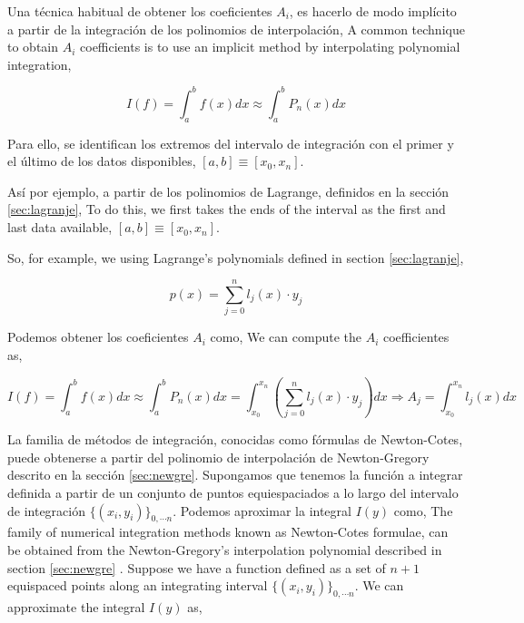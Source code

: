 \begin{paracol}{2}
Una técnica habitual de obtener los coeficientes $A_i$, es hacerlo de modo implícito a partir de la integración  de los polinomios de interpolación,
\switchcolumn
A common  technique to obtain $A_i$ coefficients is to use an implicit method by interpolating polynomial integration,
\end{paracol}
 \begin{equation*}
I(f)=\int_a^bf(x)dx \approx \int_a^bP_n(x)dx
\end{equation*}
\begin{paracol}{2}
Para ello, se identifican los extremos del intervalo de integración con el primer y el último de los datos disponibles, $[a,b]\equiv [x_0,x_n]$.

Así por ejemplo, a partir de los polinomios de Lagrange, definidos en la sección \ref{sec:lagranje},
\switchcolumn
To do this, we first takes the ends of the interval as the first and last data available, $[a,b]\equiv [x_0,x_n]$.

So, for example, we using Lagrange's polynomials defined in section \ref{sec:lagranje},
\end{paracol}
\begin{equation*}
p(x)=\sum_{j=0}^n l_j(x)\cdot y_j
\end{equation*}
\begin{paracol}{2}
Podemos obtener los coeficientes $A_i$ como,
\switchcolumn	
We can compute the $A_i$ coefficientes as,
\end{paracol}
\begin{equation*}
I(f)=\int_a^bf(x)dx \approx \int_a^bP_n(x)dx=\int_{x_0}^{x_n}\left( \sum_{j=0}^n l_j(x)\cdot y_j \right) dx \Rightarrow A_j=\int_{x_0}^{x_n}l_j(x)dx
\end{equation*}
\begin{paracol}{2}
La familia de métodos de integración, conocidas como fórmulas de Newton-Cotes, puede obtenerse a partir del polinomio de interpolación de Newton-Gregory descrito en la sección \ref{sec:newgre}. Supongamos que tenemos la función a integrar definida a partir de un conjunto de puntos equiespaciados a lo largo del intervalo de integración $\{(x_i,y_i)\}_{0,\cdots n}$. Podemos aproximar la integral $I(y)$ como,
\switchcolumn
The family of numerical integration me\-thods known as Newton-Cotes formulae, can be obtained from the Newton-Gregory's interpolation polynomial described in section \ref{sec:newgre} . Suppose we have a function defined as a set of $n+1$ equispaced points along an integrating interval $\{(x_i,y_i)\}_{0,\cdots n}$. We can approximate the integral $I(y)$ as, 
\end{paracol}
